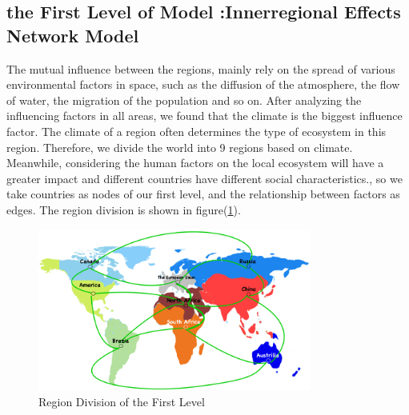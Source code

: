 \documentclass[a4paper,11pt]{article}
\begin{document}
\subsection{the First Level of Model \uppercase\expandafter{}:Innerregional Effects Network Model}
\par The mutual influence between the regions, mainly rely on the spread of various environmental factors in space, such as the diffusion of the atmosphere, the flow of water, the migration of the population and so on. After analyzing the influencing factors in all areas, we found that the climate is the biggest influence factor. The climate of a region often determines the type of ecosystem in this region. Therefore, we divide the world into 9 regions based on climate. Meanwhile, considering the human factors on the local ecosystem will have a greater impact and different countries have different social characteristics., so we take countries as nodes of our first level, and the relationship between factors as edges. The region division is shown in figure(\ref{fig:Region_Division_of_the_First_Level}).

\begin{figure}[h]%
    \centering %
    \includegraphics[width=0.8\textwidth]{./Pic/Region_Division_of_the_First_Level.jpg}
    \caption{Region Division of the First Level} 
    \label{fig:Region_Division_of_the_First_Level}  
    \end{figure}
\end{document}
